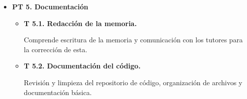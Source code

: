 \begin{itemize}
\begin{itemize}
        Seleccionar y organizar los audios a utilizar para medir el rendimiento final.
        \item \textbf{T 4.3. Cálculo de métricas.}
        
        Comprende el cálculo de métricas mediante scripts para cada modelo.
        \item \textbf{T 4.4. Análisis y representación de resultados.}
        
        Interpretación de resultados obtenidos, comparación entre modelos y elaboración de gráficas.
        \item \textbf{T 4.5. Elaboración de conclusiones y de trabajo futuro.}
        
        Recoger conclusión final en vista de los resultados y las limitaciones que estos presentan.
    \end{itemize}
    \item \textbf{PT 5. Documentación}
    \begin{itemize}
        \item \textbf{T 5.1. Redacción de la memoria.}
        
        Comprende escritura de la memoria y comunicación con los tutores para la corrección de esta. 
        \item \textbf{T 5.2. Documentación del código.}
        
        Revisión y limpieza del repositorio de código, organización de archivos y documentación básica.
    \end{itemize}
\end{itemize}